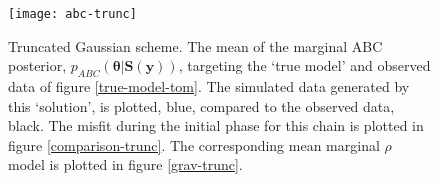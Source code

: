 \begin{figure}[H]
	\centering
	\texttt{[image: abc-trunc]}
	\caption{Truncated Gaussian scheme. The mean of the marginal ABC posterior, $p_{ABC}(\bm{\theta}|\bm{S}(\bm{y}))$, targeting the `true model' and observed data of figure \ref{true-model-tom}. The simulated data generated by this `solution', is plotted, blue, compared to the observed data, black. The misfit during the initial phase for this chain is plotted in figure \ref{comparison-trunc}. The corresponding mean marginal $\rho$ model is plotted in figure \ref{grav-trunc}.}
	\label{tom-trunc}
\end{figure}